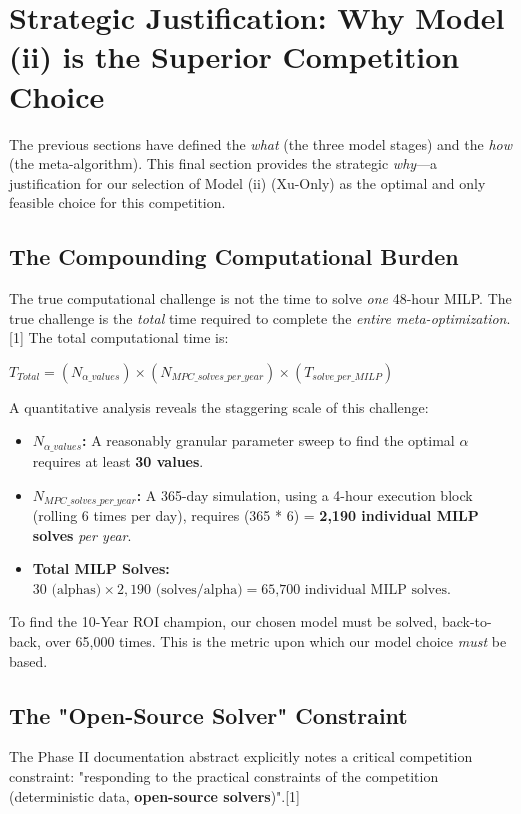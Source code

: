 \documentclass[11pt, a4paper]{article}
\begin{document}
\section{Strategic Justification: Why Model (ii) is the Superior Competition Choice}

The previous sections have defined the \textit{what} (the three model stages) and the \textit{how} (the meta-algorithm). This final section provides the strategic \textit{why}—a justification for our selection of Model (ii) (Xu-Only) as the optimal and only feasible choice for this competition.

\subsection{The Compounding Computational Burden}

The true computational challenge is not the time to solve \textit{one} 48-hour MILP. The true challenge is the \textit{total} time required to complete the \textit{entire meta-optimization}.[1] The total computational time is:

$T_{Total} = (N_{\alpha\_values}) \times (N_{MPC\_solves\_per\_year}) \times (T_{solve\_per\_MILP})$

A quantitative analysis reveals the staggering scale of this challenge:
\begin{itemize}
    \item \textbf{$N_{\alpha\_values}$:} A reasonably granular parameter sweep to find the optimal $\alpha$ requires at least \textbf{30 values}.
    \item \textbf{$N_{MPC\_solves\_per\_year}$:} A 365-day simulation, using a 4-hour execution block (rolling 6 times per day), requires (365 * 6) = \textbf{2,190 individual MILP solves} \textit{per year}.
    \item \textbf{Total MILP Solves:} $30 \text{ (alphas)} \times 2,190 \text{ (solves/alpha)} = \text{65,700 individual MILP solves.}$
\end{itemize}

To find the 10-Year ROI champion, our chosen model must be solved, back-to-back, over 65,000 times. This is the metric upon which our model choice \textit{must} be based.

\subsection{The "Open-Source Solver" Constraint}

The Phase II documentation abstract explicitly notes a critical competition constraint: "responding to the practical constraints of the competition (deterministic data, \textbf{open-source solvers})".[1]
\end{document}
